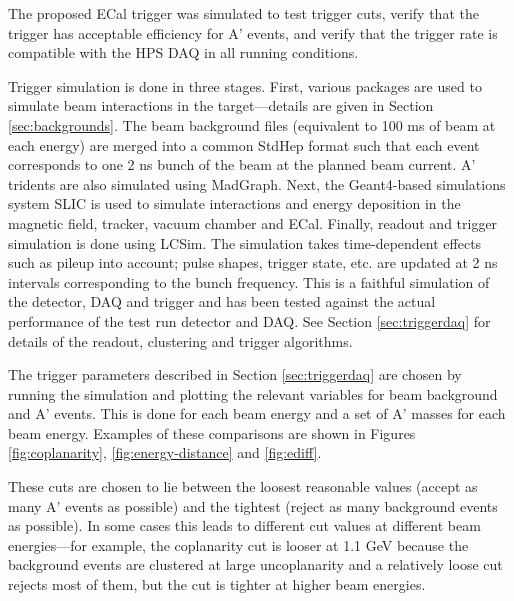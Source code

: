 
The proposed ECal trigger was simulated to test trigger cuts, verify that the trigger has acceptable efficiency for A' events, and verify that the trigger rate is compatible with the HPS DAQ in all running conditions.

Trigger simulation is done in three stages. 
First, various packages are used to simulate beam interactions in the target---details are given in Section \ref{sec:backgrounds}.
The beam background files (equivalent to 100 ms of beam at each energy) are merged into a common StdHep format such that each event corresponds to one 2 ns bunch of the beam at the planned beam current.
A' tridents are also simulated using MadGraph. 
Next, the Geant4-based simulations system SLIC \cite{slic} is used to simulate interactions and energy deposition in the magnetic field, tracker, vacuum chamber and ECal. 
Finally, readout and trigger simulation is done using LCSim. The simulation takes time-dependent effects such as pileup into account; pulse shapes, trigger state, etc. are updated at 2 ns intervals corresponding to the bunch frequency.
This is a faithful simulation of the detector, DAQ and trigger and has been tested against the actual performance of the test run detector and DAQ. See Section \ref{sec:triggerdaq} for details of the readout, clustering and trigger algorithms.

The trigger parameters described in Section \ref{sec:triggerdaq} are chosen by running the simulation and plotting the relevant variables for beam background and A' events. 
This is done for each beam energy and a set of A' masses for each beam energy. Examples of these comparisons are shown in Figures \ref{fig:coplanarity}, \ref{fig:energy-distance} and \ref{fig:ediff}.

These cuts are chosen to lie between the loosest reasonable values (accept as many A' events as possible) and the tightest (reject as many background events as possible). In some cases this leads to different cut values at different beam energies---for example, the coplanarity cut is looser at 1.1 GeV because the background events are clustered at large uncoplanarity and a relatively loose cut rejects most of them, but the cut is tighter at higher beam energies.

